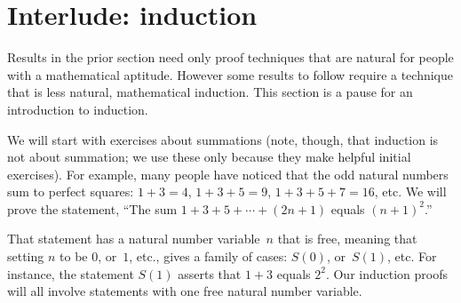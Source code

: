 \documentclass{ibl}  %
\begin{document}
\begin{problem}
\end{problem}




\section{Interlude: induction}
Results in the prior section need only proof techniques that are natural
for people with a mathematical aptitude.
However some results to follow require a technique 
that is less natural, mathematical induction.
This section is a pause for an introduction to induction.

We will start with exercises about summations 
(note, though, that induction is not about summation;
we use these only because they make helpful initial exercises).
For example, many people have noticed that the odd natural numbers sum to 
perfect squares: $1+3=4$, $1+3+5=9$, $1+3+5+7=16$, etc.
We will prove the statement,
``The sum $1+3+5+\cdots+(2n+1)$ equals $(n+1)^2$.'' 

That statement has a natural number variable~$n$ that is free, 
meaning that setting $n$ to be $0$, or~$1$, etc., gives 
a family of cases: $S(0)$, or~$S(1)$, 
etc.  
For instance, the statement $S(1)$ asserts that $1+3$ equals $2^2$.
Our induction proofs will all involve statements with one free 
natural number variable.
\end{document}
